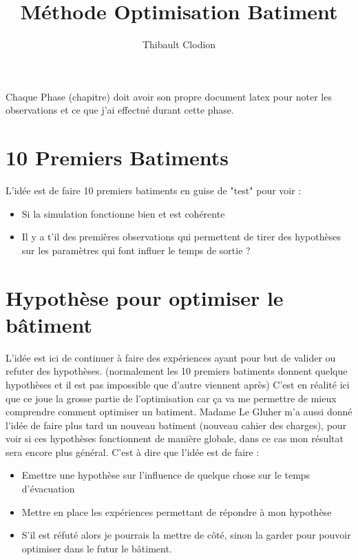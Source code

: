\documentclass[12pt]{article}
\title{Méthode Optimisation Batiment}
\author{Thibault Clodion}
\begin{document}
\maketitle %

Chaque Phase (chapitre) doit avoir son propre document latex pour noter les observations et ce que j'ai effectué durant cette phase.

\section{10 Premiers Batiments}

L'idée est de faire 10 premiers batiments en guise de "test" pour voir :
\begin{itemize}
    \item Si la simulation fonctionne bien et est cohérente
    \item Il y a t'il des premières observations qui permettent de tirer des hypothèses
    sur les paramètres qui font influer le temps de sortie ?
\end{itemize}

\section{Hypothèse pour optimiser le bâtiment}

L'idée est ici de continuer à faire des expériences ayant pour but de valider ou refuter des hypothèses.
(normalement les 10 premiers batiments donnent quelque hypothèses et il est pas impossible que d'autre viennent après)
\newline\newline
C'est en réalité ici que ce joue la grosse partie de l'optimisation car ça va me permettre de mieux comprendre comment optimiser un batiment.
Madame Le Gluher m'a aussi donné l'idée de faire plus tard un nouveau batiment (nouveau cahier des charges), pour voir si ces hypothèses
fonctionnent de manière globale, dans ce cas mon résultat sera encore plus général.
\newline\newline
C'est à dire que l'idée est de faire :
\begin{itemize}
    \item Emettre une hypothèse sur l'influence de quelque chose sur le temps d'évacuation
    \item Mettre en place les expériences permettant de répondre à mon hypothèse
    \item S'il est réfuté alors je pourrais la mettre de côté, sinon la garder pour pouvoir optimiser dans le futur
    le bâtiment.
\end{itemize}
\end{document}
